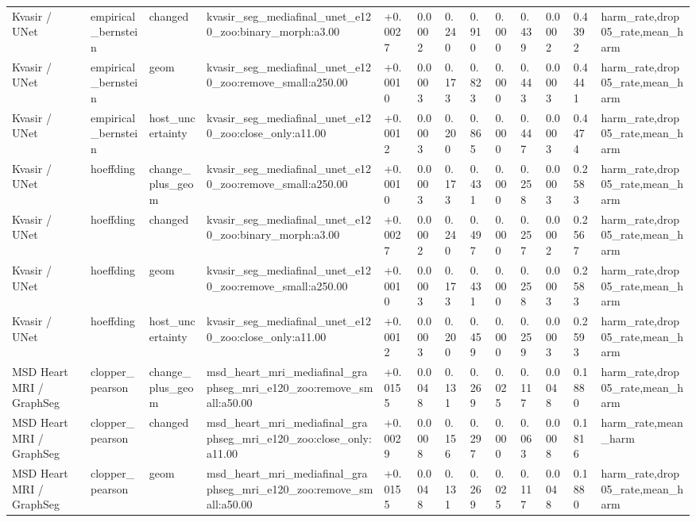 \begin{table}[t]
\begin{tabular}{lllllllllllll}
Kvasir / UNet & empirical\_bernstein & changed & kvasir\_seg\_mediafinal\_unet\_e120\_zoo:binary\_morph:a3.00 & +0.0027 & 0.0002 & 0.240 & 0.910 & 0.000 & 0.439 & 0.0002 & 0.4392 & harm\_rate,drop05\_rate,mean\_harm \\
Kvasir / UNet & empirical\_bernstein & geom & kvasir\_seg\_mediafinal\_unet\_e120\_zoo:remove\_small:a250.00 & +0.0010 & 0.0003 & 0.173 & 0.823 & 0.000 & 0.443 & 0.0003 & 0.4441 & harm\_rate,drop05\_rate,mean\_harm \\
Kvasir / UNet & empirical\_bernstein & host\_uncertainty & kvasir\_seg\_mediafinal\_unet\_e120\_zoo:close\_only:a11.00 & +0.0012 & 0.0003 & 0.200 & 0.865 & 0.000 & 0.447 & 0.0003 & 0.4474 & harm\_rate,drop05\_rate,mean\_harm \\
Kvasir / UNet & hoeffding & change\_plus\_geom & kvasir\_seg\_mediafinal\_unet\_e120\_zoo:remove\_small:a250.00 & +0.0010 & 0.0003 & 0.173 & 0.431 & 0.000 & 0.258 & 0.0003 & 0.2583 & harm\_rate,drop05\_rate,mean\_harm \\
Kvasir / UNet & hoeffding & changed & kvasir\_seg\_mediafinal\_unet\_e120\_zoo:binary\_morph:a3.00 & +0.0027 & 0.0002 & 0.240 & 0.497 & 0.000 & 0.257 & 0.0002 & 0.2567 & harm\_rate,drop05\_rate,mean\_harm \\
Kvasir / UNet & hoeffding & geom & kvasir\_seg\_mediafinal\_unet\_e120\_zoo:remove\_small:a250.00 & +0.0010 & 0.0003 & 0.173 & 0.431 & 0.000 & 0.258 & 0.0003 & 0.2583 & harm\_rate,drop05\_rate,mean\_harm \\
Kvasir / UNet & hoeffding & host\_uncertainty & kvasir\_seg\_mediafinal\_unet\_e120\_zoo:close\_only:a11.00 & +0.0012 & 0.0003 & 0.200 & 0.459 & 0.000 & 0.259 & 0.0003 & 0.2593 & harm\_rate,drop05\_rate,mean\_harm \\
MSD Heart MRI / GraphSeg & clopper\_pearson & change\_plus\_geom & msd\_heart\_mri\_mediafinal\_graphseg\_mri\_e120\_zoo:remove\_small:a50.00 & +0.0155 & 0.0048 & 0.131 & 0.269 & 0.025 & 0.117 & 0.0048 & 0.1880 & harm\_rate,drop05\_rate,mean\_harm \\
MSD Heart MRI / GraphSeg & clopper\_pearson & changed & msd\_heart\_mri\_mediafinal\_graphseg\_mri\_e120\_zoo:close\_only:a11.00 & +0.0029 & 0.0008 & 0.156 & 0.297 & 0.000 & 0.063 & 0.0008 & 0.1816 & harm\_rate,mean\_harm \\
MSD Heart MRI / GraphSeg & clopper\_pearson & geom & msd\_heart\_mri\_mediafinal\_graphseg\_mri\_e120\_zoo:remove\_small:a50.00 & +0.0155 & 0.0048 & 0.131 & 0.269 & 0.025 & 0.117 & 0.0048 & 0.1880 & harm\_rate,drop05\_rate,mean\_harm \\

\end{tabular}
\end{table}
